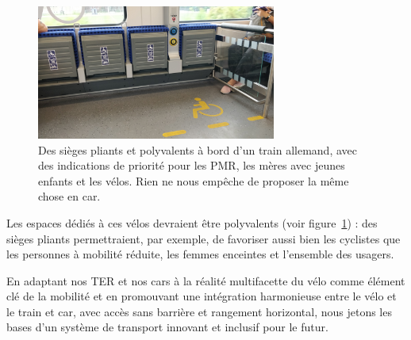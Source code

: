 \begin{figure}[ht]
  \centering
  \includegraphics[width=0.7\textwidth]{images/IMG_20230826_102932-seats.jpg}
  \caption{Des sièges pliants et polyvalents à bord d'un train
    allemand, avec des indications de priorité pour les PMR, les mères
    avec jeunes enfants et les vélos.  Rien ne nous empêche de
    proposer la même chose en car.}
  \label{fig:train-velo-allemand-horizontal}
\end{figure}

Les espaces dédiés à ces vélos devraient être polyvalents (voir
figure~\ref{fig:train-velo-allemand-horizontal}) : des sièges pliants
permettraient, par exemple, de favoriser aussi bien les cyclistes que
les personnes à mobilité réduite, les femmes enceintes et l'ensemble
des usagers.

En adaptant nos TER et nos cars à la réalité multifacette du vélo
comme élément clé de la mobilité et en promouvant une intégration
harmonieuse entre le vélo et le train et car, avec accès sans barrière
et rangement horizontal, nous jetons les bases d'un système de
transport innovant et inclusif pour le futur.
